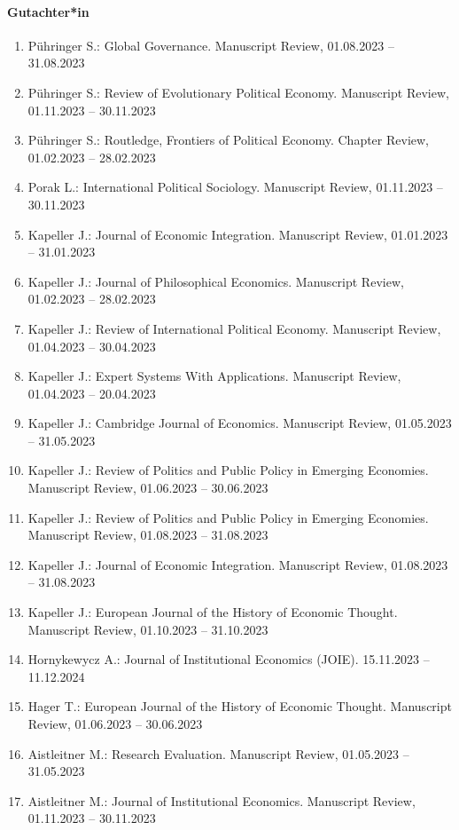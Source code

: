 \paragraph{Gutachter*in}
\begin{enumerate}[leftmargin=*, labelsep=0.5cm]
\item Pühringer S.: Global Governance. Manuscript Review, 01.08.2023 -- 31.08.2023
\item Pühringer S.: Review of Evolutionary Political Economy. Manuscript Review, 01.11.2023 -- 30.11.2023
\item Pühringer S.: Routledge, Frontiers of Political Economy. Chapter Review, 01.02.2023 -- 28.02.2023
\item Porak L.: International Political Sociology. Manuscript Review, 01.11.2023 -- 30.11.2023
\item Kapeller J.: Journal of Economic Integration. Manuscript Review, 01.01.2023 -- 31.01.2023
\item Kapeller J.: Journal of Philosophical Economics. Manuscript Review, 01.02.2023 -- 28.02.2023
\item Kapeller J.: Review of International Political Economy. Manuscript Review, 01.04.2023 -- 30.04.2023
\item Kapeller J.: Expert Systems With Applications. Manuscript Review, 01.04.2023 -- 20.04.2023
\item Kapeller J.: Cambridge Journal of Economics. Manuscript Review, 01.05.2023 -- 31.05.2023
\item Kapeller J.: Review of Politics and Public Policy in Emerging Economies. Manuscript Review, 01.06.2023 -- 30.06.2023
\item Kapeller J.: Review of Politics and Public Policy in Emerging Economies. Manuscript Review, 01.08.2023 -- 31.08.2023
\item Kapeller J.: Journal of Economic Integration. Manuscript Review, 01.08.2023 -- 31.08.2023
\item Kapeller J.: European Journal of the History of Economic Thought. Manuscript Review, 01.10.2023 -- 31.10.2023
\item Hornykewycz A.: Journal of Institutional Economics (JOIE). 15.11.2023 -- 11.12.2024
\item Hager T.: European Journal of the History of Economic Thought. Manuscript Review, 01.06.2023 -- 30.06.2023
\item Aistleitner M.: Research Evaluation. Manuscript Review, 01.05.2023 -- 31.05.2023
\item Aistleitner M.: Journal of Institutional Economics. Manuscript Review, 01.11.2023 -- 30.11.2023
\end{enumerate}

